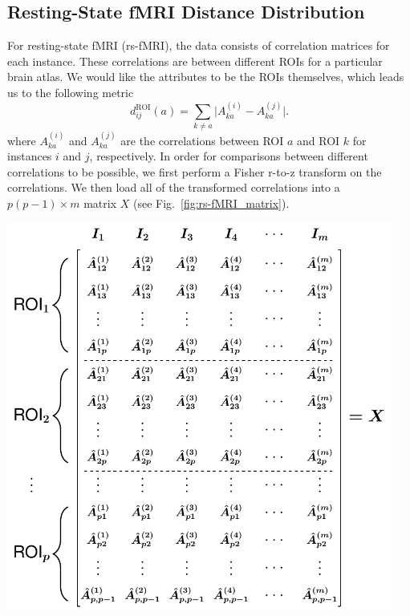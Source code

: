 \documentclass[10pt,letterpaper]{article}\usepackage[]{graphicx}\usepackage[]{color}
\begin{document}
\bigskip

\subsection{Resting-State fMRI Distance Distribution}

For resting-state fMRI (rs-fMRI), the data consists of correlation matrices for each instance. These correlations are between different ROIs for a particular brain atlas. We would like the attributes to be the ROIs themselves, which leads us to the following metric
%
\begin{equation}\label{eq:diff_rs-fMRI}
d^\text{ROI}_{ij}(a) = \sum_{k \neq a}\bigl|A^{(i)}_{ka} - A^{(j)}_{ka}\bigr|.
\end{equation}
where $A^{(i)}_{ka}$ and $A^{(j)}_{ka}$ are the correlations between ROI $a$ and ROI $k$ for instances $i$ and $j$, respectively. In order for comparisons between different correlations to be possible, we first perform a Fisher r-to-z transform on the correlations. We then load all of the transformed correlations into a $p(p-1) \times m$ matrix $X$ (see Fig.~\ref{fig:rs-fMRI_matrix}).

\bigskip

\begin{minipage}[c]{0.7\textwidth}\hspace{-0.6cm}
	\includegraphics[width=0.95\textwidth]{rs_fmri_all_instance_matrix.pdf}
\end{minipage}\hspace{-0.8cm}
\begin{minipage}[c]{0.3\textwidth}
	\label{fig:rs-fMRI_matrix}
\end{minipage}
\end{document}
